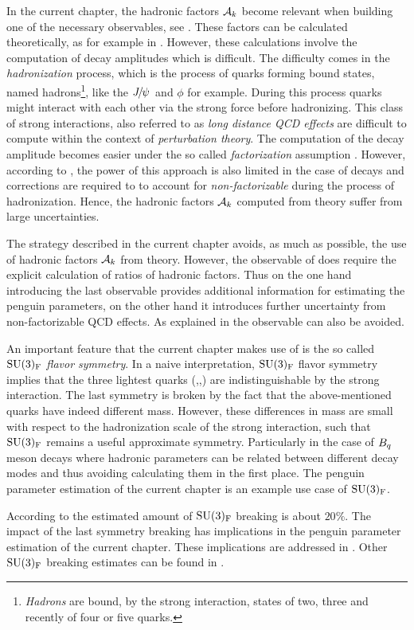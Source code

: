 In the current chapter, the hadronic factors $\mathcal{A}_{k}$ become relevant when building
one of the necessary observables, see . These factors can be calculated
theoretically, as for example in \cite{DeBruyn-thesis}. However, these calculations involve
the computation of \BJpsiX decay amplitudes which is difficult. The difficulty comes in the
{\it hadronization} process, which is the process of quarks forming bound states, named
hadrons\footnote{ {\it Hadrons} are bound, by the strong interaction, states of two,
three and recently \cite{Aaij:2016nsc} of four or five quarks.}, like the ${J\mskip -3mu/\mskip -2mu\psi\mskip 2mu}$ and $\phi$ for example.
During this process quarks might interact with each other via the strong force before hadronizing.
This class of strong interactions, also referred to as {\it long distance QCD effects}
are difficult to compute within the context of {\it perturbation theory}.
The computation of the \BJpsiX decay amplitude becomes easier under the so called
{\it factorization} assumption \cite{HAAN1970448,Wirbel1985,CABIBBO1978418,FAKIROV1978315}.
However, according to \cite{DeBruyn-thesis},
the power of this approach is also limited in the case of \BJpsiX decays and corrections
are required to to account for {\it non-factorizable} during the process of hadronization.
Hence, the hadronic factors $\mathcal{A}_{k}$ computed from theory suffer from large uncertainties.

The strategy described in the current chapter avoids, as much as possible, the use of hadronic
factors $\mathcal{A}_{k}$ from theory. However, the observable of 
does require the explicit calculation of ratios of hadronic factors. Thus on the one hand
introducing the last observable provides additional information for estimating the penguin
parameters, on the other hand it introduces further uncertainty from non-factorizable QCD effects.
As explained in  the observable  can also be avoided.

An important feature that the current chapter makes use of is the so called
$\mathrm{SU}(3)_{\rm F}$ {\it flavor symmetry}\cite{GELLMANN1964214,NEEMAN1961222}.
In a naive interpretation, $\mathrm{SU}(3)_{\rm F}$ flavor symmetry implies that the three lightest quarks (\uquark,\dquark,\squark)
are indistinguishable by the strong interaction. The last symmetry is broken by the fact that the above-mentioned
quarks have indeed different mass. However, these differences in mass are small with respect
to the hadronization scale \lqcd of the strong interaction, such that $\mathrm{SU}(3)_{\rm F}$
remains a useful approximate symmetry. Particularly in the case of $B_q$ meson decays where hadronic
parameters can be related between different decay modes and thus avoiding calculating them in the first place.
The penguin parameter estimation of the current chapter is an example use case of $\mathrm{SU}(3)_{\rm F}$.

According to \cite{Nagashima:2007qn,Gronau:2013mda} the estimated amount of $\mathrm{SU}(3)_{\rm F}$ breaking is about $20\%$.
The impact of the last symmetry breaking has implications in the penguin parameter estimation
of the current chapter. These implications are addressed in .
Other $\mathrm{SU}(3)_{\rm F}$ breaking estimates can be found in \cite{Charles:2015gya,PDG}.
